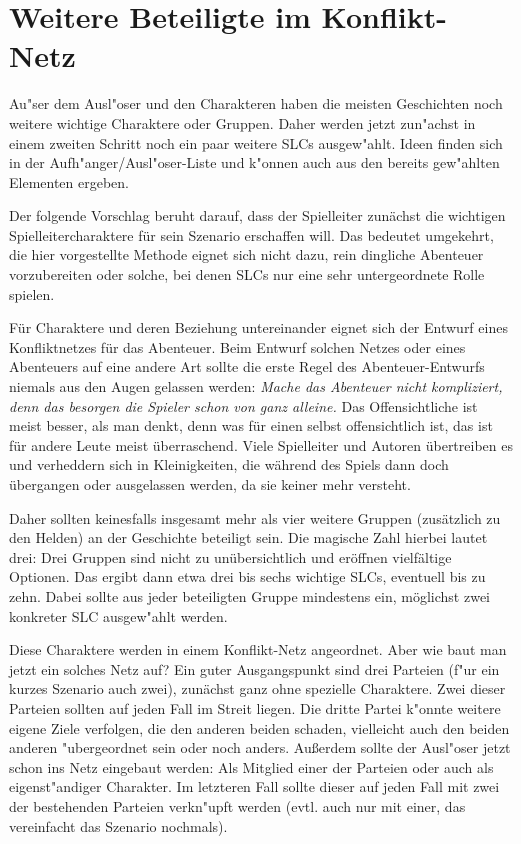 \section{Weitere Beteiligte im Konflikt-Netz}
Au"ser dem Ausl"oser und den Charakteren haben die meisten Geschichten noch weitere wichtige Charaktere oder Gruppen. Daher werden jetzt zun"achst in einem zweiten Schritt noch ein paar weitere SLCs ausgew"ahlt. Ideen finden sich in der Aufh"anger/Ausl"oser-Liste und k"onnen auch aus den bereits gew"ahlten Elementen ergeben.

Der folgende Vorschlag beruht darauf, dass der Spielleiter zunächst die wichtigen Spielleitercharaktere für sein Szenario erschaffen will. Das bedeutet umgekehrt, die hier vorgestellte Methode eignet sich nicht dazu, rein dingliche Abenteuer vorzubereiten oder solche, bei denen SLCs nur eine sehr untergeordnete Rolle spielen.

Für Charaktere und deren Beziehung untereinander eignet sich der Entwurf eines Konfliktnetzes für das Abenteuer. Beim Entwurf solchen Netzes oder eines Abenteuers auf eine andere Art sollte die erste Regel des Abenteuer-Entwurfs niemals aus den Augen gelassen werden: \emph{Mache das Abenteuer nicht kompliziert, denn das besorgen die Spieler schon von ganz alleine.} Das Offensichtliche ist meist besser, als man denkt, denn was für einen selbst offensichtlich ist, das ist für andere Leute meist überraschend. Viele Spielleiter und Autoren übertreiben es und verheddern sich in Kleinigkeiten, die während des Spiels dann doch übergangen oder ausgelassen werden, da sie keiner mehr versteht.

Daher sollten keinesfalls insgesamt mehr als vier weitere Gruppen (zusätzlich zu den Helden) an der Geschichte beteiligt sein. Die magische Zahl hierbei lautet drei: Drei Gruppen sind nicht zu unübersichtlich und eröffnen vielfältige Optionen. Das ergibt dann etwa drei bis sechs wichtige SLCs, eventuell bis zu zehn. Dabei sollte aus jeder beteiligten Gruppe mindestens ein, möglichst zwei konkreter SLC ausgew"ahlt werden.

Diese Charaktere werden in einem Konflikt-Netz angeordnet. 
Aber wie baut man jetzt ein solches Netz auf? Ein guter Ausgangspunkt sind drei Parteien (f"ur ein kurzes Szenario auch zwei), zunächst ganz ohne spezielle Charaktere. Zwei dieser Parteien sollten auf jeden Fall im Streit liegen. Die dritte Partei k"onnte weitere eigene Ziele verfolgen, die den anderen beiden schaden, vielleicht auch den beiden anderen "ubergeordnet sein oder noch anders. Außerdem sollte der Ausl"oser jetzt schon ins Netz eingebaut werden: Als Mitglied einer der Parteien oder auch als eigenst"andiger Charakter. Im letzteren Fall sollte dieser auf jeden Fall mit zwei der bestehenden Parteien verkn"upft werden (evtl. auch nur mit einer, das vereinfacht das Szenario nochmals).

